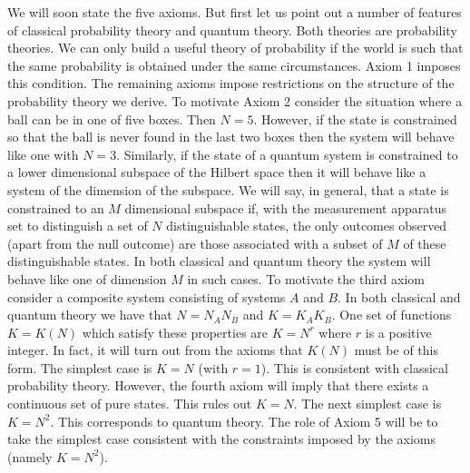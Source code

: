 \documentclass[12pt]{article}
\begin{document}
We will soon state the five axioms.  But first let us point out a number
of features of classical probability theory and quantum theory.
Both theories are probability theories.  We can only build a useful
theory of probability if the world is such that the same probability is
obtained under the same circumstances.  Axiom 1 imposes this condition.
The remaining axioms impose restrictions on the structure of the
probability theory we derive.  To motivate Axiom 2 consider
the situation where a ball can be in one of five boxes. Then
$N=5$.  However, if the state is constrained so that the ball is never
found in the last two boxes then the system will behave like one with
$N=3$.  Similarly, if the state of a quantum system is constrained to a lower
dimensional subspace of the Hilbert space then it will behave like a
system of the dimension of the subspace. We will say, in general, that a
state is constrained to an $M$ dimensional subspace if, with the
measurement apparatus set to distinguish a set of $N$ distinguishable
states, the only outcomes observed (apart from the null outcome)
are those associated with a subset of
$M$ of these distinguishable states.  In both classical and quantum
theory the system will behave like one of dimension $M$ in such cases.
To motivate the third axiom
consider a composite system consisting of systems $A$ and $B$.  In both
classical and quantum theory we have that $N=N_AN_B$ and $K=K_AK_B$.
One set of functions $K=K(N)$ which satisfy these properties are $K=N^r$
where $r$ is a positive integer.  In fact, it will turn out from the
axioms that $K(N)$ must be of this form.  The simplest case is $K=N$ (with
$r=1$).  This is consistent with classical probability theory.  However,
the fourth axiom will imply that there exists a continuous set of pure
states.  This rules out $K=N$.  The next simplest case is $K=N^2$.  This
corresponds to quantum theory.  The role of Axiom 5 will be to take the
simplest case consistent with the constraints imposed by the
axioms (namely $K=N^2$).
\end{document}

